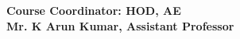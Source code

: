 \documentclass[11pt,paper=a4,answers]{exam}
\begin{document}
	\begin{flushleft}
		\textbf{Course Coordinator: \hspace{10cm}\textbf{HOD, AE}\\ 
			Mr. K Arun Kumar, Assistant Professor} \\
	\end{flushleft}
\end{document}
